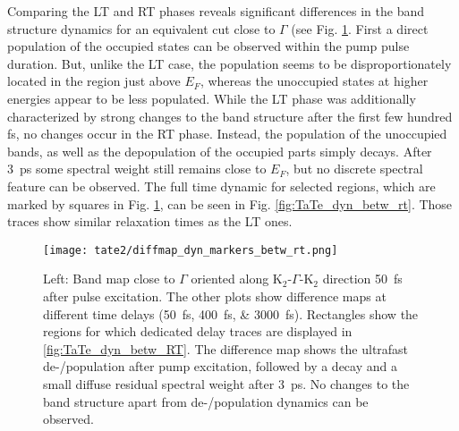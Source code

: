 Comparing the LT and RT phases reveals significant differences in the band structure dynamics for an equivalent cut close to $\Gamma$ (see Fig. \ref{fig:TaTe_bandmap_dyn_betw_rt}.
First a direct population of the occupied states can be observed within the pump pulse duration.
But, unlike the LT case, the population seems to be disproportionately located in the region just above $E_F$, whereas the unoccupied states at higher energies appear to be less populated.
While the LT phase was additionally characterized by strong changes to the band structure after the first few hundred \unit{\femto\second}, no changes occur in the RT phase.
Instead, the population of the unoccupied bands, as well as the depopulation of the occupied parts simply decays.
After \qty{3}{\pico\second} some spectral weight still remains close to $E_F$, but no discrete spectral feature can be observed.
The full time dynamic for selected regions, which are marked by squares in Fig. \ref{fig:TaTe_bandmap_dyn_betw_rt}, can be seen in Fig. \ref{fig:TaTe_dyn_betw_rt}.
Those traces show similar relaxation times as the LT ones.

\begin{figure}[t!]
	\centering
	\texttt{[image: tate2/diffmap\_dyn\_markers\_betw\_rt.png]}
	\caption{Left: Band map close to $\Gamma$ oriented along K$_2$-$\Gamma$-K$_2$ direction \qty{50}{\femto\second} after pulse excitation. The other plots show difference maps at different time delays (\qtylist{50;400;3000}{\femto\second}). Rectangles show the regions for which dedicated delay traces are displayed in \ref{fig:TaTe_dyn_betw_RT}. The difference map shows the ultrafast de-/population after pump excitation, followed by a decay and a small diffuse residual spectral weight after \qty{3}{\pico\second}. No changes to the band structure apart from de-/population dynamics can be observed.}
	\label{fig:TaTe_bandmap_dyn_betw_rt}
\end{figure}

